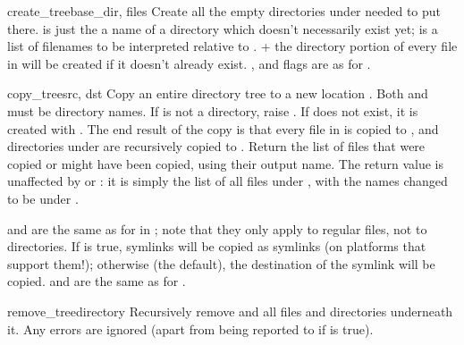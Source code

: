 \documentclass{manual}
\begin{document}
\begin{funcdesc}{create_tree}{base_dir, files}
Create all the empty directories under  needed to
put  there.   is just the a name of a directory
which doesn't necessarily exist yet;  is a list of filenames
to be interpreted relative to .   + the
directory portion of every file in  will be created if it
doesn't already exist.  ,  and  flags 
are as for .
\end{funcdesc}

\begin{funcdesc}{copy_tree}{src, dst}
Copy an entire directory tree  to a new location .  Both
 and  must be directory names.  If  is not a
directory, raise .  If  does 
not exist, it is created with .  The end result of the 
copy is that every file in  is copied to , and 
directories under  are recursively copied to .  
Return the list of files that were copied or might have been copied,
using their output name. The return value is unaffected by 
or : it is simply the list of all files under ,
with the names changed to be under .

 and  are the same as for
 in ;
note that they only apply to regular files, not to directories.  If
 is true, symlinks will be copied as symlinks
(on platforms that support them!); otherwise (the default), the
destination of the symlink will be copied.   and
 are the same as for
.
\end{funcdesc}

\begin{funcdesc}{remove_tree}{directory}
Recursively remove  and all files and directories underneath
it. Any errors are ignored (apart from being reported to  if
 is true).
\end{funcdesc}

\end{document}
